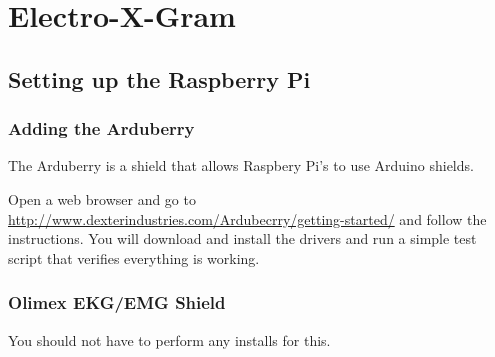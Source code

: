 \chapter{Electro-X-Gram}


\section{Setting up the Raspberry Pi}

\subsection{Adding the Arduberry}

The Arduberry is a shield that allows Raspbery Pi's to use Arduino shields.

Open a web browser and go to \url{http://www.dexterindustries.com/Ardubecrry/getting-started/} and follow the instructions.  You will download and install the drivers and run a simple test script that verifies everything is working.

\subsection{Olimex EKG/EMG Shield}

You should not have to perform any installs for this.